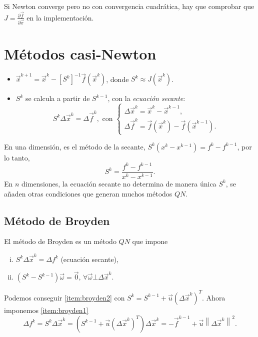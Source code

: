 \begin{obs}
    Si Newton converge pero no con convergencia cuadr\'atica, hay que comprobar que $J = \frac{\partial\vec{f}}{\partial\vec{x}}$ en la implementaci\'on.
\end{obs}

\section{M\'etodos casi-Newton}

\begin{itemize}
    \item $\vec{x}^{k+1} = \vec{x}^k - \left[ S^k \right]^{-1} \vec{f}\left( \vec{x}^k \right)$, donde $S^k \approx J\left( \vec{x}^k \right)$.
    \item $S^k$ se calcula a partir de $S^{k-1}$, con la \emph{ecuaci\'on secante}:
        \[
            S^k\Delta\vec{x}^k = \Delta \vec{f}^k,\text{ con }
            \begin{cases}
                \Delta\vec{x}^k = \vec{x}^k - \vec{x}^{k-1}, \\
                \Delta\vec{f}^k = \vec{f}\left( \vec{x}^k \right) - \vec{f}\left( \vec{x}^{k-1} \right).
            \end{cases}
        \]
\end{itemize}

\noindent En una dimensi\'on, es el m\'etodo de la secante, $S^k\left( x^k - x^{k-1} \right) = f^k - f^{k-1}$, por lo tanto,
\[
    S^k = \frac{f^k - f^{k-1}}{x^k - x^{k-1}}.
\]
\noindent En $n$ dimensiones, la ecuaci\'on secante no determina de manera \'unica $S^k$, se añaden otras condiciones que generan muchos m\'etodos $QN$.

\subsection{M\'etodo de Broyden}

\noindent El m\'etodo de Broyden es un m\'etodo $QN$ que impone
\begin{enumerate}[i)]
    \item\label{item:broyden1} $S^k\Delta\vec{x}^k = \Delta f^k$ (ecuaci\'on secante),
    \item\label{item:broyden2} $\left( S^k - S^{k-1} \right)\vec{\omega} = \vec{0}, \, \forall \vec{\omega} \bot \Delta \vec{x}^k$.
\end{enumerate}

\noindent Podemos conseguir \ref{item:broyden2} con $S^k = S^{k-1} + \vec{u}\left( \Delta\vec{x}^k \right)^T$.
Ahora imponemos \ref{item:broyden1}
\[
    \Delta f^k = S^k\Delta \vec{x}^k = \left( S^{k-1}+\vec{u}\left( \Delta\vec{x}^k \right)^T \right)\Delta\vec{x}^k = -\vec{f}^{k-1} + \vec{u}\left\| \Delta \vec{x}^k\right\|^2.
\]

